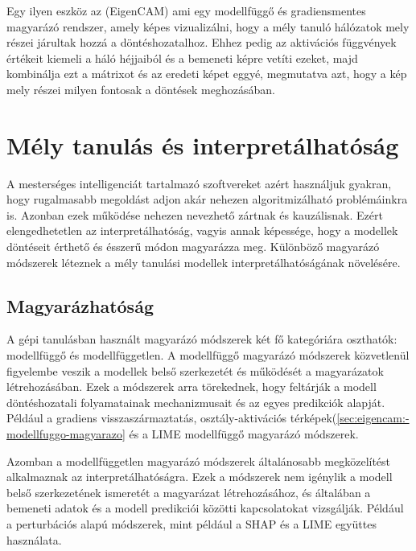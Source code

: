 \documentclass[12pt,oneside,a4paper]{article}
\newcommand{\newsection}[1]{\clearpage\section{#1}}\label{makro}
\theoremstyle{remark}
\begin{document}
    Egy ilyen eszköz az  (\gls{EigenCAM}) ami egy modellfüggő és gradiensmentes magyarázó rendszer,
    amely képes vizualizálni, hogy a mély tanuló hálózatok mely részei járultak hozzá a döntéshozatalhoz.
    Ehhez pedig
    az aktivációs függvények értékeit kiemeli a háló héjjaiból és a bemeneti képre vetíti ezeket, majd kombinálja
    ezt a mátrixot és az eredeti képet eggyé, megmutatva azt, hogy a kép mely részei milyen fontosak a döntések meghozásában.

\newsection{Mély tanulás és interpretálhatóság}\label{sec:mely-tanulas-es-interpretalhatosag}
A mesterséges intelligenciát tartalmazó szoftvereket azért használjuk gyakran, hogy rugalmasabb megoldást adjon akár
nehezen algoritmizálható problémáinkra is.
Azonban ezek működése nehezen nevezhető zártnak és kauzálisnak.
 Ezért elengedhetetlen az interpretálhatóság, vagyis annak képessége, hogy a modellek
döntéseit érthető és ésszerű módon magyarázza meg.
    Különböző magyarázó módszerek léteznek a mély tanulási modellek interpretálhatóságának növelésére.

\subsection{Magyarázhatóság}\label{subsec:magyarazhatosag}
A gépi tanulásban használt magyarázó módszerek két fő kategóriára oszthatók: modellfüggő és modellfüggetlen.
A modellfüggő magyarázó módszerek közvetlenül figyelembe veszik a modellek belső szerkezetét és működését a magyarázatok
létrehozásában.
Ezek a módszerek arra törekednek, hogy feltárják a modell döntéshozatali folyamatainak mechanizmusait és az
egyes predikciók alapját.
Például a gradiens visszaszármaztatás, osztály-aktivációs térképek(\ref{sec:eigencam:-modellfuggo-magyarazo}\label{sechiv}
és a LIME modellfüggő magyarázó módszerek.

Azomban a modellfüggetlen magyarázó módszerek általánosabb megközelítést alkalmaznak az interpretálhatóságra.
Ezek a módszerek nem igénylik a modell belső szerkezetének ismeretét a magyarázat létrehozásához, és általában
a bemeneti adatok és a modell predikciói közötti kapcsolatokat vizsgálják.
Például a perturbációs alapú módszerek, mint például a SHAP és a LIME együttes használata.
\end{document}
